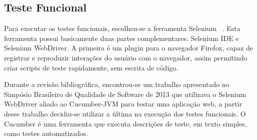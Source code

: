 \documentclass[12pt]{article}
\begin{document}




\subsection{Teste Funcional}
Para executar os testes funcionais, escolheu-se a ferramenta Selenium ~\cite{SELENIUM}. Esta ferramenta possui basicamente duas partes complementares: Selenium IDE e Selenium WebDriver. A primeira é um plugin para o navegador Firefox, capaz de registrar e reproduzir interações do usuário com o navegador, assim permitindo criar scripts de teste rapidamente, sem escrita de código.

Durante a revisão bibliográfica, encontrou-se um trabalho apresentado no Simpósio Brasileiro de Qualidade de Software de 2013 \cite{sbqs2013} que utilizava o Selenium WebDriver aliado ao Cucumber-JVM \cite{CUCUMBER} para testar uma aplicação web, a partir desse trabalho decidiu-se utilizar a última na execução dos testes funcionais. O Cucumber é uma ferramenta que executa descrições de teste, em texto simples, como testes automatizados.


\end{document}
